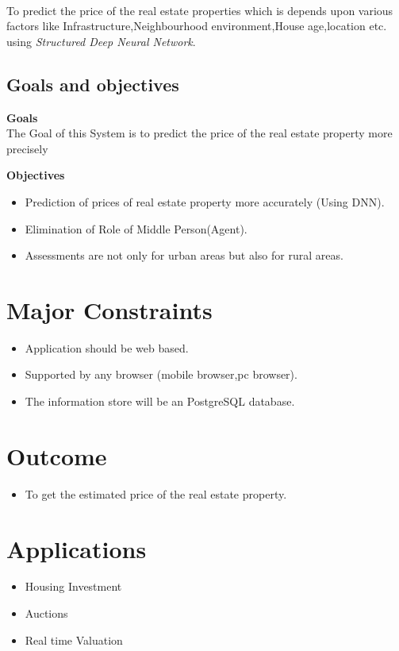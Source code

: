 \documentclass[11pt,fleqn]{book} %
\begin{document}
\paragraph*{}
To predict the price of the real estate properties which is depends upon various factors like Infrastructure,Neighbourhood environment,House age,location etc. using \emph{Structured Deep Neural Network}.

\subsection{Goals and objectives}
\textbf{Goals}
\\The Goal of this System is to predict the price of the real estate property more precisely

\textbf{Objectives}
	
	\begin{itemize}
	\item Prediction of prices of real estate property more accurately (Using DNN).
	\item Elimination of Role of Middle Person(Agent).
	\item Assessments are not only for urban areas but also for rural areas.
\end{itemize}

\section{Major Constraints}
\begin{itemize}
\item Application should be web based.
\item Supported by any browser (mobile browser,pc browser). 
\item The information store will be an PostgreSQL database.
\end{itemize}

 
\section{Outcome}
\begin{itemize}
\item  To get the estimated price of the real estate property.
\end{itemize}

\section{Applications}
\begin{itemize}
\item Housing Investment
\item Auctions
\item Real time Valuation
\end{itemize}
\end{document}
